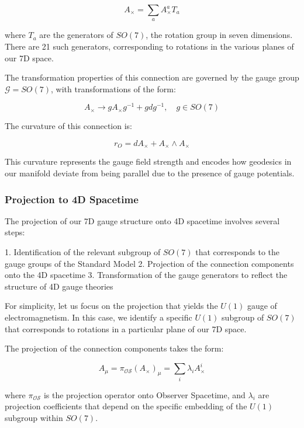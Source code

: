 \documentclass{article}
\begin{document}
\begin{equation}
A_{\times} = \sum_a A^a_{\times} T_a
\end{equation}

where $T_a$ are the generators of $SO(7)$, the rotation group in seven dimensions. There are 21 such generators, corresponding to rotations in the various planes of our 7D space.

The transformation properties of this connection are governed by the gauge group $\mathcal{G} = SO(7)$, with transformations of the form:

\begin{equation}
A_{\times} \rightarrow g A_{\times} g^{-1} + g dg^{-1}, \quad g \in SO(7)
\end{equation}

The curvature of this connection is:

\begin{equation}
r_O = dA_{\times} + A_{\times} \wedge A_{\times}
\end{equation}

This curvature represents the gauge field strength and encodes how geodesics in our manifold deviate from being parallel due to the presence of gauge potentials.

\subsubsection{Projection to 4D Spacetime}

The projection of our 7D gauge structure onto 4D spacetime involves several steps:

1. Identification of the relevant subgroup of $SO(7)$ that corresponds to the gauge groups of the Standard Model
2. Projection of the connection components onto the 4D spacetime
3. Transformation of the gauge generators to reflect the structure of 4D gauge theories

For simplicity, let us focus on the projection that yields the $U(1)$ gauge of electromagnetism. In this case, we identify a specific $U(1)$ subgroup of $SO(7)$ that corresponds to rotations in a particular plane of our 7D space.

The projection of the connection components takes the form:

\begin{equation}
A_{\mu} = \pi_{\mathcal{OS}}(A_{\times})_{\mu} = \sum_i \lambda_i A^i_{\times}
\end{equation}

where $\pi_{\mathcal{OS}}$ is the projection operator onto Observer Spacetime, and $\lambda_i$ are projection coefficients that depend on the specific embedding of the $U(1)$ subgroup within $SO(7)$.
\end{document}
